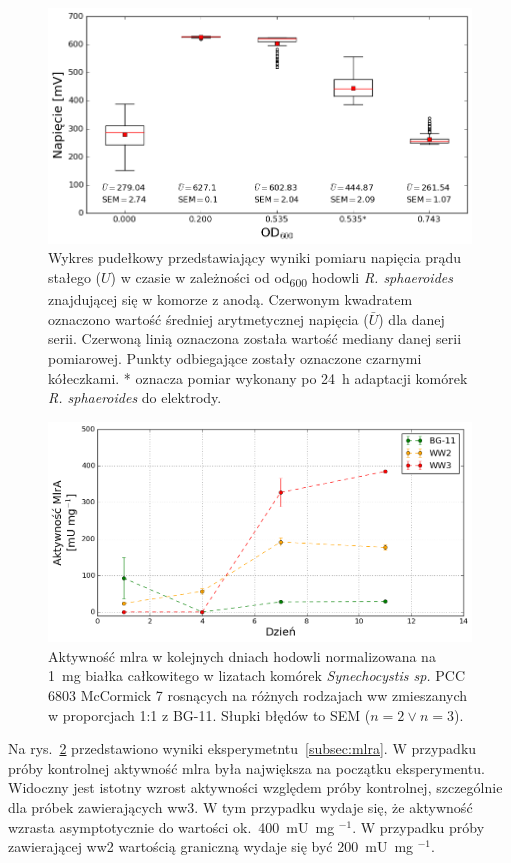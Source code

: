 \begin{figure}[b!]
    \centering
    \includegraphics[width=12.5cm]{figures/mfc-volt-boxplt}
    \caption{
        Wykres pudełkowy przedstawiający wyniki pomiaru napięcia prądu stałego ($U$)
        w czasie w zależności od \acrshort{od}\textsubscript{600} hodowli
        \textit{R. sphaeroides} znajdującej się w komorze z anodą.
        Czerwonym kwadratem oznaczono wartość średniej arytmetycznej napięcia
        ($\bar{U}$) dla danej serii.
        Czerwoną linią oznaczona została wartość mediany danej serii pomiarowej.
        Punkty odbiegające zostały oznaczone czarnymi kółeczkami.
        * oznacza pomiar wykonany po 24~h adaptacji komórek
        \textit{R. sphaeroides} do elektrody.
    }
    \label{fig:3}
\end{figure}

\newpage

\begin{figure}[h!]
    \centering
    \includegraphics[width=12.5cm]{figures/mlra_activity}
    \caption{
        Aktywność \acrshort{mlra} w kolejnych dniach hodowli
        normalizowana na 1~mg  białka całkowitego w lizatach komórek
        \textit{Synechocystis sp.} PCC 6803 McCormick 7
        rosnących na różnych rodzajach \acrshort{ww} zmieszanych
        w proporcjach 1:1 z BG-11. Słupki błędów to SEM ($n = 2 \vee n = 3$).
    }
    \label{fig:4}
\end{figure}

Na rys.~\ref{fig:4} przedstawiono wyniki eksperymetntu~\ref{subsec:mlra}.
W przypadku próby kontrolnej aktywność \acrshort{mlra} była
największa na początku eksperymentu.
Widoczny jest istotny wzrost aktywności względem próby kontrolnej,
szczególnie dla próbek zawierających \acrshort{ww}3.
W tym przypadku wydaje się, że aktywność wzrasta asymptotycznie
do wartości ok.\ 400~mU~mg $^{-1}$.
W przypadku próby zawierającej \acrshort{ww}2 wartością
graniczną wydaje się być 200~mU~mg $^{-1}$.

